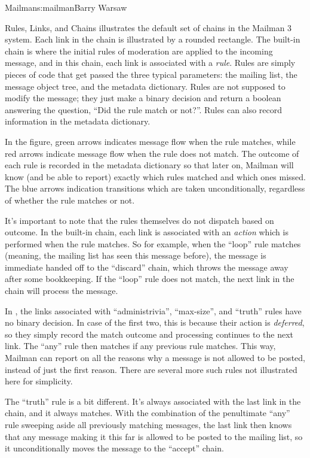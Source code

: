 \begin{aosachapter}{Mailman}{s:mailman}{Barry Warsaw}
\begin{aosasect1}{Rules, Links, and Chains}
 illustrates the default set of chains
in the Mailman 3 system.  Each link in the chain is illustrated by a
rounded rectangle.  The built-in chain is where the initial rules of
moderation are applied to the incoming message, and in this chain,
each link is associated with a \emph{rule}.  Rules are simply pieces
of code that get passed the three typical parameters: the mailing
list, the message object tree, and the metadata dictionary.  Rules are
not supposed to modify the message; they just make a binary decision
and return a boolean answering the question, ``Did the rule match or
not?''.  Rules can also record information in the metadata dictionary.

In the figure, green arrows indicates message flow when the rule
matches, while red arrows indicate message flow when the rule does not
match.  The outcome of each rule is recorded in the metadata
dictionary so that later on, Mailman will know (and be able to report)
exactly which rules matched and which ones missed.  The blue arrows
indication transitions which are taken unconditionally, regardless of
whether the rule matches or not.


It's important to note that the rules themselves do not dispatch based
on outcome.  In the built-in chain, each link is associated with an
\emph{action} which is performed when the rule matches.  So for
example, when the ``loop'' rule matches (meaning, the mailing list has
seen this message before), the message is immediate handed off to the
``discard'' chain, which throws the message away after some
bookkeeping.  If the ``loop'' rule does not match, the next link in
the chain will process the message.

In , the links associated with
``administrivia'', ``max-size'', and ``truth'' rules have no binary
decision.  In case of the first two, this is because their action is
\emph{deferred}, so they simply record the match outcome and
processing continues to the next link.  The ``any'' rule then matches
if any previous rule matches.  This way, Mailman can report on all the
reasons why a message is not allowed to be posted, instead of just the
first reason.  There are several more such rules not illustrated here
for simplicity.

The ``truth'' rule is a bit different.  It's always associated with
the last link in the chain, and it always matches.  With the
combination of the penultimate ``any'' rule sweeping aside all
previously matching messages, the last link then knows that any
message making it this far is allowed to be posted to the
mailing list, so it unconditionally moves the message to the
``accept'' chain.


\end{aosasect1}
\end{aosachapter}
